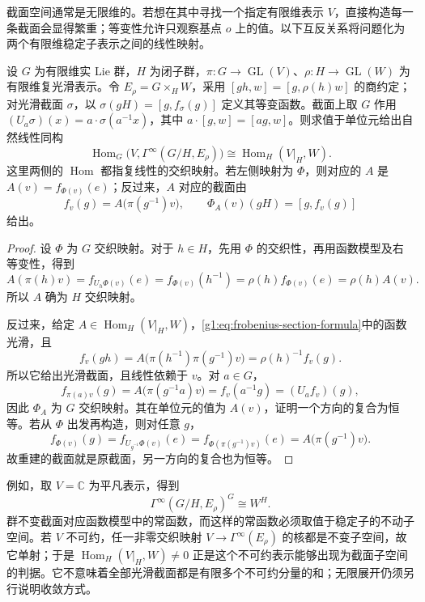 截面空间通常是无限维的。若想在其中寻找一个指定有限维表示 \(V\)，直接构造每一条截面会显得繁重；等变性允许只观察基点 \(o\) 上的值。以下互反关系将问题化为两个有限维稳定子表示之间的线性映射。

\begin{theorem}\label{g1:thm:smooth-frobenius-reciprocity}
	设 \(G\) 为有限维实 Lie 群，\(H\) 为闭子群，\(\pi:G\to\operatorname{GL}(V)\)、\(\rho:H\to\operatorname{GL}(W)\) 为有限维复光滑表示。令 \(E_\rho=G\times_H W\)，采用 \([gh,w]=[g,\rho(h)w]\) 的商约定；对光滑截面 \(\sigma\)，以 \(\sigma(gH)=[g,f_\sigma(g)]\) 定义其等变函数。截面上取 \(G\) 作用 \((U_a\sigma)(x)=a\cdot\sigma(a^{-1}x)\)，其中 \(a\cdot[g,w]=[ag,w]\)。则求值于单位元给出自然线性同构
	\begin{equation}\label{g1:eq:smooth-frobenius-reciprocity}
		\operatorname{Hom}_G\bigl(V,\Gamma^\infty(G/H,E_\rho)\bigr)
		\cong\operatorname{Hom}_H(V|_H,W).
	\end{equation}
	这里两侧的 \(\operatorname{Hom}\) 都指复线性的交织映射。若左侧映射为 \(\Phi\)，则对应的 \(A\) 是
	\(A(v)=f_{\Phi(v)}(e)\)；反过来，\(A\) 对应的截面由
	\begin{equation}\label{g1:eq:frobenius-section-formula}
		f_v(g)=A\bigl(\pi(g^{-1})v\bigr),\qquad
		\Phi_A(v)(gH)=[g,f_v(g)]
	\end{equation}
	给出。
\end{theorem}
\begin{proof}
	设 \(\Phi\) 为 \(G\) 交织映射。对于 \(h\in H\)，先用 \(\Phi\) 的交织性，再用函数模型及右等变性，得到
	\[
		A(\pi(h)v)
		=f_{U_h\Phi(v)}(e)
		=f_{\Phi(v)}(h^{-1})
		=\rho(h)f_{\Phi(v)}(e)=\rho(h)A(v).
	\]
	所以 \(A\) 确为 \(H\) 交织映射。

	反过来，给定 \(A\in\operatorname{Hom}_H(V|_H,W)\)，\eqref{g1:eq:frobenius-section-formula}中的函数光滑，且
	\[
		f_v(gh)=A\bigl(\pi(h^{-1})\pi(g^{-1})v\bigr)
		=\rho(h)^{-1}f_v(g).
	\]
	所以它给出光滑截面，且线性依赖于 \(v\)。对 \(a\in G\)，
	\[
		f_{\pi(a)v}(g)=A\bigl(\pi(g^{-1}a)v\bigr)
		=f_v(a^{-1}g)=(U_af_v)(g),
	\]
	因此 \(\Phi_A\) 为 \(G\) 交织映射。其在单位元的值为 \(A(v)\)，证明一个方向的复合为恒等。若从 \(\Phi\) 出发再构造，则对任意 \(g\)，
	\[
		f_{\Phi(v)}(g)
		=f_{U_{g^{-1}}\Phi(v)}(e)
		=f_{\Phi(\pi(g^{-1})v)}(e)
		=A\bigl(\pi(g^{-1})v\bigr).
	\]
	故重建的截面就是原截面，另一方向的复合也为恒等。
\end{proof}

例如，取 \(V=\mathbb C\) 为平凡表示，得到
\[
	\Gamma^\infty(G/H,E_\rho)^G\cong W^H.
\]
群不变截面对应函数模型中的常函数，而这样的常函数必须取值于稳定子的不动子空间。若 \(V\) 不可约，任一非零交织映射 \(V\to\Gamma^\infty(E_\rho)\) 的核都是不变子空间，故它单射；于是 \(\operatorname{Hom}_H(V|_H,W)\ne0\) 正是这个不可约表示能够出现为截面子空间的判据。它不意味着全部光滑截面都是有限多个不可约分量的和；无限展开仍须另行说明收敛方式。

